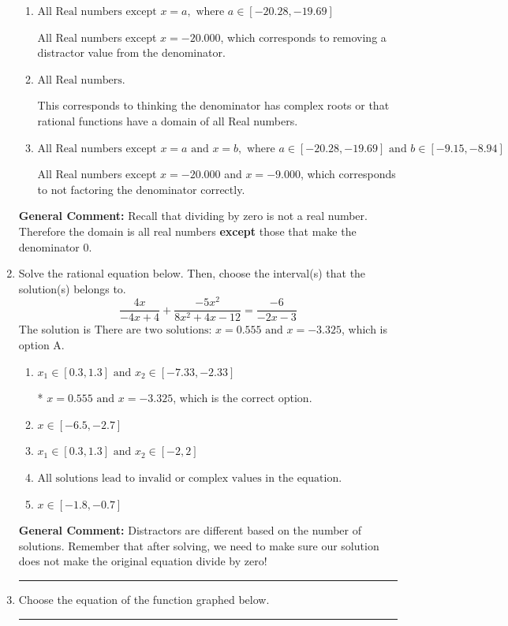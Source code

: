 \documentclass{extbook}[14pt]
\newcommand{\litem}[1]{\item #1

\rule{\textwidth}{0.4pt}}
\begin{document}
\begin{enumerate}
{\begin{enumerate}[label=\Alph*.]
All Real numbers except $x = -1.000$ and $x = -0.800$, which is the correct option.
\item \( \text{All Real numbers except } x = a, \text{ where } a \in [-20.28, -19.69] \)

All Real numbers except $x = -20.000$, which corresponds to removing a distractor value from the denominator.
\item \( \text{All Real numbers.} \)

This corresponds to thinking the denominator has complex roots or that rational functions have a domain of all Real numbers.
\item \( \text{All Real numbers except } x = a \text{ and } x = b, \text{ where } a \in [-20.28, -19.69] \text{ and } b \in [-9.15, -8.94] \)

All Real numbers except $x = -20.000$ and $x = -9.000$, which corresponds to not factoring the denominator correctly.
\end{enumerate}

\textbf{General Comment:} Recall that dividing by zero is not a real number. Therefore the domain is all real numbers \textbf{except} those that make the denominator 0.
}
\litem{
Solve the rational equation below. Then, choose the interval(s) that the solution(s) belongs to.
\[ \frac{4x}{-4x + 4} + \frac{-5x^{2}}{8x^{2} +4 x -12} = \frac{-6}{-2x -3} \]
The solution is \( \text{There are two solutions: } x = 0.555 \text{ and } x = -3.325 \), which is option A.\begin{enumerate}[label=\Alph*.]
\item \( x_1 \in [0.3, 1.3] \text{ and } x_2 \in [-7.33,-2.33] \)

* $x = 0.555 \text{ and } x = -3.325$, which is the correct option.
\item \( x \in [-6.5,-2.7] \)


\item \( x_1 \in [0.3, 1.3] \text{ and } x_2 \in [-2,2] \)


\item \( \text{All solutions lead to invalid or complex values in the equation.} \)


\item \( x \in [-1.8,-0.7] \)


\end{enumerate}

\textbf{General Comment:} Distractors are different based on the number of solutions. Remember that after solving, we need to make sure our solution does not make the original equation divide by zero!
}
\litem{
Choose the equation of the function graphed below.

}
\end{enumerate}
\end{document}
